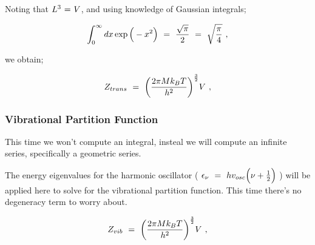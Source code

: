 \documentclass{article}
\begin{document}
Noting that \begin{math} L^3 \hspace{0.025cm} = \hspace{0.025cm} V \end{math}, and using knowledge of Gaussian integrals;

\begin{equation} \label{eq:256}
\int_{0}^{\infty} d x \exp{\Big(-x^2 \Big)} \hspace{0.125cm} = \hspace{0.125cm} \frac{\sqrt{\pi}}{2} \hspace{0.125cm} = \hspace{0.125cm} \sqrt{\frac{\pi}{4}} \hspace{0.125cm} ,
\end{equation}

we obtain;

\begin{equation} \label{eq:256}
Z_{trans} \hspace{0.125cm} = \hspace{0.125cm} \bigg( \frac{2 \pi M k_B T}{h^2} \bigg)^{\frac{3}{2}} V \hspace{0.125cm} ,
\end{equation}




\subsubsection{Vibrational Partition Function} 

This time we won't compute an integral, insteal we will compute an infinite series, specifically a geometric series. 

The energy eigenvalues for the harmonic oscillator ( \begin{math} \epsilon_{\nu} \hspace{0.125cm} = \hspace{0.125cm} h v_{osc} \Big( \nu + \frac{1}{2} \Big) \end{math} ) will be applied here to solve for the vibrational partition function. This time there's no degeneracy term to worry about.

\begin{equation} \label{eq:256}
Z_{vib} \hspace{0.125cm} = \hspace{0.125cm} \bigg( \frac{2 \pi M k_B T}{h^2} \bigg)^{\frac{3}{2}} V \hspace{0.125cm} ,
\end{equation}
\end{document}

